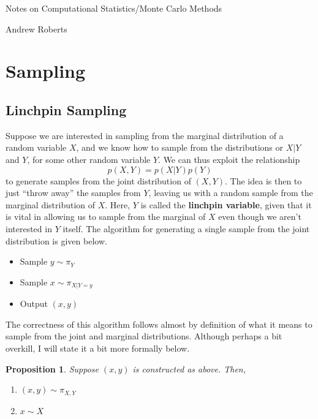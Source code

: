 \documentclass[12pt]{article}
\newtheorem{prop}{Proposition}
\begin{document}
\begin{center}
\Large
Notes on Computational Statistics/Monte Carlo Methods
\end{center}

\begin{flushright}
Andrew Roberts
\end{flushright} 

\section{Sampling}

\subsection{Linchpin Sampling}
Suppose we are interested in sampling from the marginal distribution of a random variable $X$, and we know how to sample from the distributions or $X|Y$ 
and $Y$, for some other random variable $Y$. We can thus exploit the relationship
\[p(X, Y) = p(X|Y)p(Y)\]
to generate samples from the joint distribution of $(X, Y)$. The idea is then to just ``throw away'' the samples from $Y$, leaving us with a random sample from the marginal
distribution of $X$. Here, $Y$ is called the \textbf{linchpin variable}, given that it is vital in allowing us to sample from the marginal of $X$ even though we aren't interested in 
$Y$ itself. The algorithm for generating a single sample from the joint distribution is given below. 
\begin{itemize}
\item Sample $y \sim \pi_Y$
\item Sample $x \sim \pi_{X|Y=y}$
\item Output $(x, y)$
\end{itemize}

The correctness of this algorithm follows almost by definition of what it means to sample from the joint and marginal distributions. Although perhaps a bit overkill, 
I will state it a bit more formally below. 
\begin{prop}
Suppose $(x, y)$ is constructed as above. Then, 
\begin{enumerate}
\item $(x, y) \sim \pi_{X, Y}$
\item $x \sim X$
\end{enumerate}
\end{prop}
\end{document}
